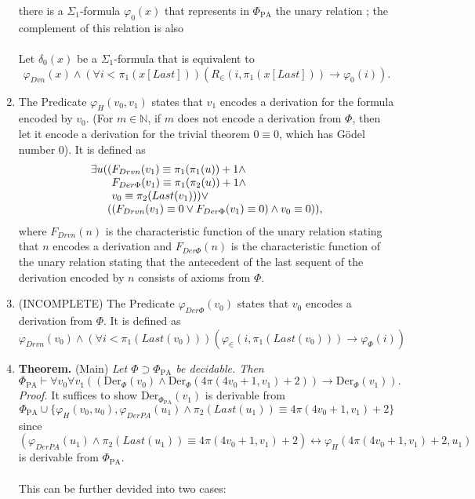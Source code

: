 \documentclass[leqno]{report}
\newcommand{\nat}{\mathbb{N}}
\newcommand{\pa}{\mathrm{PA}}
\newcommand{\Der}[1]{\mathrm{Der}_{#1}}
\begin{document}
\begin{enumerate}[1.]
there is a $\Sigma_1$-formula $\varphi_0(x)$ that represents in $\Phi_\pa$ the unary relation  ; the complement of this relation is also \\
\ \\
Let $\delta_0(x)$ be a $\Sigma_1$-formula that is equivalent to
\[
\varphi_{Dvn}(x) \land (\forall i < \pi_1 (x[Last]))(R_\in (i, \pi_1 (x[Last])) \rightarrow \varphi_0 (i)).
\]
%
\item The Predicate $\varphi_H(v_0, v_1)$ states that $v_1$ encodes a derivation for the formula encoded by $v_0$. (For $m \in \nat$, if $m$ does not encode a derivation from $\Phi$, then let it encode a derivation for the trivial theorem $0 \equiv 0$, which has G\"{o}del number $0$). It is defined as
\[
\begin{array}{l}
\exists u ((F_{Drvn}(v_1) \equiv \pi_1 (\pi_1 (u)) + 1 \land\cr
\phantom{\exists u()} F_{Der\Phi} (v_1) \equiv \pi_1 (\pi_2 (u)) + 1 \land\cr
\phantom{\exists u()} v_0 \equiv \pi_2 (Last(v_1))) \lor\cr
\phantom{\exists u(} ((F_{Drvn}(v_1) \equiv 0 \lor F_{Der\Phi} (v_1) \equiv 0) \land v_0 \equiv 0)),
\end{array}
\]
where $F_{Drvn}(n)$ is the characteristic function of the unary relation stating that $n$ encodes a derivation and $F_{Der\Phi}(n)$ is the characteristic function of the unary relation stating that the antecedent of the last sequent of the derivation encoded by $n$ consists of axioms from $\Phi$.
%
\item (INCOMPLETE) The Predicate $\varphi_{Der\Phi}(v_0)$ states that $v_0$ encodes a derivation from $\Phi$. It is defined as
\[
\varphi_{Drvn}(v_0) \land (\forall i < \pi_1 (Last(v_0)))(\varphi_\in (i, \pi_1 (Last(v_0))) \rightarrow \varphi_\Phi (i))
\]
%
\item \textbf{Theorem.} (Main) \emph{Let $\Phi \supset \Phi_\pa$ be decidable. Then
\[
\Phi_\pa \vdash \forall v_0 \forall v_1 ((\Der{\Phi}(v_0) \land \Der{\Phi}(4\pi (4v_0 + 1, v_1) + 2)) \rightarrow \Der{\Phi}(v_1)).
\]}
\textit{Proof.} It suffices to show $\Der{\Phi_\pa}(v_1)$ is derivable from
\[
\Phi_\pa \cup \{ \varphi_H (v_0, u_0), \varphi_{DerPA} (u_1) \land \pi_2 (Last(u_1)) \equiv 4\pi (4v_0 + 1, v_1) + 2 \}
\]
since
\[
(\varphi_{DerPA} (u_1) \land \pi_2 (Last(u_1)) \equiv 4\pi (4v_0 + 1, v_1) + 2) \leftrightarrow \varphi_H (4\pi (4v_0 + 1, v_1) + 2, u_1)
\]
is derivable from $\Phi_\pa$.\\
\ \\
This can be further devided into two cases:
\begin{enumerate}[(1)]

\end{enumerate}
\end{enumerate}
\end{document}

